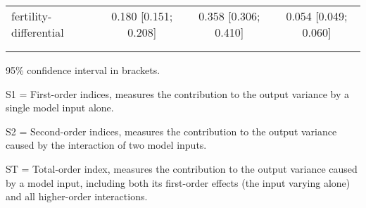 \begin{table}[htp]
\begin{threeparttable}
\begin{tabular}{lccc}
	  \hspace{1.5em} fertility-differential & 0.180 [0.151; 0.208]   & 0.358 [0.306; 0.410]   & 0.054 [0.049; 0.060] \\
	 \\
    \addlinespace
    \hline
    \end{tabular}
    \begin{tablenotes}
    \scriptsize
    \item 95\% confidence interval in brackets.
    \item S1 = First-order indices,  measures the contribution to the output variance by a single model input alone.
    \item S2 = Second-order indices,  measures the contribution to the output variance caused by the interaction of two model inputs.
    \item ST = Total-order index, measures the contribution to the output variance caused by a model input, including both its first-order effects (the input varying alone) and all higher-order interactions.
    \end{tablenotes}
    \end{threeparttable}
    \end{table}
